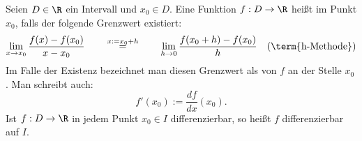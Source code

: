 Seien $D \in \R$ ein Intervall und $x_0 \in D$. Eine Funktion $f: D \to \R$ heißt  im Punkt $x_0$, falls der folgende Grenzwert existiert:
$$
\lim_{x \to x_0} \frac{f(x)-f(x_0)}{x-x_0} 
\qquad 
\stackrel{x := x_0 + h}{=}
\qquad 
\lim_{h \to 0} \frac{f(x_0 + h) - f(x_0)}{h} \quad \text{(\term{h-Methode})}
$$
Im Falle der Existenz bezeichnet man diesen Grenzwert als  von $f$ an der Stelle $x_0$. Man schreibt auch:
$$f'(x_0) := \frac{df}{dx}(x_0).$$
Ist $f: D \to \R$ in  jedem Punkt $x_0 \in I$ differenzierbar, so heißt $f$ differenzierbar auf $I$.